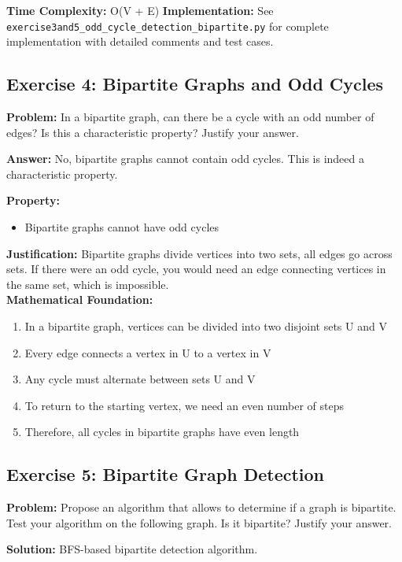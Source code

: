 \documentclass[12pt,a4paper]{article}
\begin{document}
\textbf{Time Complexity:} O(V + E)
\textbf{Implementation:} See \texttt{exercise3and5\_odd\_cycle\_detection\_bipartite.py} for complete implementation with detailed comments and test cases.

\subsection{Exercise 4: Bipartite Graphs and Odd Cycles}

\textbf{Problem:} In a bipartite graph, can there be a cycle with an odd number of edges? Is this a characteristic property? Justify your answer.

\textbf{Answer:} No, bipartite graphs cannot contain odd cycles. This is indeed a characteristic property.

\textbf{Property:}
\begin{itemize}
    \item Bipartite graphs cannot have odd cycles
\end{itemize}

\textbf{Justification:} Bipartite graphs divide vertices into two sets, all edges go across sets. If there were an odd cycle, you would need an edge connecting vertices in the same set, which is impossible.\\


\textbf{Mathematical Foundation:}
\begin{enumerate}
    \item In a bipartite graph, vertices can be divided into two disjoint sets U and V
    \item Every edge connects a vertex in U to a vertex in V
    \item Any cycle must alternate between sets U and V
    \item To return to the starting vertex, we need an even number of steps
    \item Therefore, all cycles in bipartite graphs have even length
\end{enumerate}

\subsection{Exercise 5: Bipartite Graph Detection}

\textbf{Problem:} Propose an algorithm that allows to determine if a graph is bipartite. Test your algorithm on the following graph. Is it bipartite? Justify your answer.

\textbf{Solution:} BFS-based bipartite detection algorithm.
\end{document}
